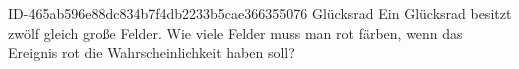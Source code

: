 \begin{exercise}
      {ID-465ab596e88dc834b7f4db2233b5cae366355076}
      {Glücksrad}
  \ifproblem\problem
    Ein Glücksrad besitzt zwölf gleich große Felder. Wie viele Felder muss man
    rot färben, wenn das Ereignis \glqq rot\grqq{} die Wahrscheinlichkeit 
    haben soll?
  \fi
\end{exercise}
